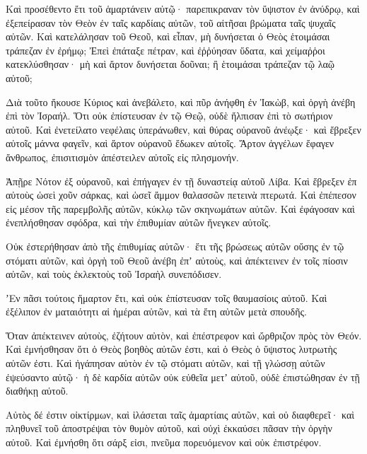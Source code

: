 \begin{spacing}{1.1}
\begin{multicols}{2}
Καὶ προσέθεντο ἔτι τοῦ ἁμαρτάνειν αὐτῷ· παρεπικραναν τὸν ὕψιστον ἐν ἀνύδρῳ,
καὶ ἐξεπείρασαν τὸν Θεὸν ἐν ταῖς καρδίαις αὐτῶν, τοῦ αἰτῆσαι βρώματα ταῖς ψυχαῖς αὐτῶν.
Καὶ κατελάλησαν τοῦ Θεοῦ, καὶ εἶπαν, μὴ δυνήσεται ὁ Θεὸς ἑτοιμάσαι τράπεζαν ἐν ἐρήμῳ;
Ἐπεὶ ἐπάταξε πέτραν, καὶ ἐῤῥύησαν ὕδατα, καὶ χείμαῤῥοι κατεκλύσθησαν· μὴ καὶ ἄρτον δυνήσεται δοῦναι; ἢ ἑτοιμάσαι τράπεζαν τῷ λαῷ αὐτοῦ;

Διὰ τοῦτο ἤκουσε Κύριος καὶ ἀνεβάλετο, καὶ πῦρ ἀνήφθη ἐν Ἰακὼβ, καὶ ὀργὴ ἀνέβη ἐπὶ τὸν Ἰσραήλ.
Ὅτι οὐκ ἐπίστευσαν ἐν τῷ Θεῷ, οὐδὲ ἤλπισαν ἐπὶ τὸ σωτήριον αὐτοῦ.
Καὶ ἐνετείλατο νεφέλαις ὑπεράνωθεν, καὶ θύρας οὐρανοῦ ἀνέῳξε·
καὶ ἔβρεξεν αὐτοῖς μάννα φαγεῖν, καὶ ἄρτον οὐρανοῦ ἔδωκεν αὐτοῖς.
Ἄρτον ἀγγέλων ἔφαγεν ἄνθρωπος, ἐπισιτισμὸν ἀπέστειλεν αὐτοῖς εἰς πλησμονήν.

Ἀπῇρε Νότον ἐξ οὐρανοῦ, καὶ ἐπήγαγεν ἐν τῇ δυναστείᾳ
αὐτοῦ Λίβα. Καὶ ἔβρεξεν ἐπ αὐτοὺς ὡσεὶ χοῦν σάρκας, καὶ ὡσεῖ ἄμμον θαλασσῶν πετεινὰ πτερωτά.
Καὶ ἐπέπεσον εἰς μέσον τῆς παρεμβολῆς αὐτῶν, κύκλῳ τῶν σκηνωμάτων αὐτῶν.
Καὶ ἐφάγοσαν καὶ ἐνεπλήσθησαν σφόδρα, καὶ τὴν ἐπιθυμίαν αὐτῶν ἤνεγκεν αὐτοῖς.

Οὐκ ἐστερήθησαν ἀπὸ τῆς ἐπιθυμίας αὐτῶν· ἔτι τῆς βρώσεως
αὐτῶν οὔσης ἐν τῷ στόματι αὐτῶν, καὶ ὀργὴ τοῦ Θεοῦ ἀνέβη ἐπʼ αὐτοὺς, καὶ ἀπέκτεινεν ἐν τοῖς πίοσιν αὐτῶν, καὶ τοὺς ἐκλεκτοὺς τοῦ Ἰσραὴλ συνεπόδισεν.

ʼΕν πᾶσι τούτοις ἥμαρτον ἔτι, καὶ οὐκ ἐπίστευσαν τοῖς
θαυμασίοις αὐτοῦ. Καὶ ἐξέλιπον ἐν ματαιότητι αἱ ἡμέραι αὐτῶν, καὶ τὰ ἔτη αὐτῶν μετὰ σπουδῆς.

Ὅταν ἀπέκτεινεν αὐτοὺς, ἐζήτουν αὐτὸν, καὶ ἐπέστρεφον καὶ
ὤρθριζον πρὸς τὸν Θεόν. Καὶ ἐμνήσθησαν ὅτι ὁ Θεὸς βοηθὸς αὐτῶν ἐστι, καὶ ὁ Θεὸς ὁ ὕψιστος λυτρωτὴς αὐτῶν ἐστι.
Καὶ ἠγάπησαν αὐτὸν ἐν τῷ στόματι αὐτῶν, καὶ τῇ γλώσσῃ αὐτῶν
ἐψεύσαντο αὐτῷ· ἡ δὲ καρδία αὐτῶν οὐκ εὐθεῖα μετʼ αὐτοῦ, οὐδὲ ἐπιστώθησαν ἐν τῇ διαθήκῃ αὐτοῦ.

Αὐτὸς δέ ἐστιν οἰκτίρμων, καὶ ἱλάσεται ταῖς ἁμαρτίαις αὐτῶν, καὶ οὐ διαφθερεῖ· καὶ πληθυνεῖ τοῦ ἀποστρέψαι τὸν θυμὸν αὐτοῦ, καὶ οὐχὶ ἐκκαύσει πᾶσαν τὴν ὀργὴν αὐτοῦ.
Καὶ ἐμνήσθη ὅτι σάρξ εἰσι, πνεῦμα πορευόμενον καὶ οὐκ ἐπιστρέφον.


\end{multicols}
\end{spacing}
